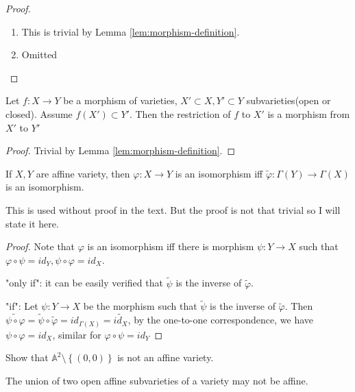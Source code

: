 \documentclass{solution}
\begin{document}
\begin{proof}
    \begin{enumerate}
        \item This is trivial by Lemma \ref{lem:morphism-definition}.
        \item Omitted 
    \end{enumerate}
\end{proof}

\begin{problem}{6.16}
    Let $f: X \rightarrow Y$ be a morphism of varieties, $X' \subset X, Y' \subset Y$ subvarieties(open or closed). Assume $f(X') \subset Y'$. Then the restriction of $f$ to $X'$ is a morphism from $X'$ to $Y'$
\end{problem}

\begin{proof}
    Trivial by Lemma \ref{lem:morphism-definition}.
\end{proof}

\begin{lemma} \label{lem:isomorphism}
    If $X, Y$ are affine variety, then $\varphi: X \rightarrow Y$ is an isomorphism iff $\tilde{\varphi}: \Gamma(Y) \rightarrow \Gamma(X)$ is an isomorphism.
\end{lemma}

This is used without proof in the text. But the proof is not that trivial so I will state it here.

\begin{proof}
    Note that $\varphi$ is an isomorphism iff there is morphism $\psi: Y \rightarrow X$ such that $\varphi \circ \psi = id_{Y}, \psi \circ \varphi = id_{X}$.

    "only if": it can be easily verified that $\tilde{\psi}$ is the inverse of $\tilde{\varphi}$.

    "if": Let $\psi: Y \rightarrow X$ be the morphism such that $\tilde{\psi}$ is the inverse of $\tilde{\varphi}$. Then $\tilde{\psi \circ \varphi} = \tilde{\psi} \circ \tilde{\varphi} = id_{\Gamma(X)} = \tilde{id_{X}}$, by the one-to-one correspondence, we have $\psi \circ \varphi = id_X$, similar for $\varphi \circ \psi = id_Y$
\end{proof}

\begin{problem}{6.17}
    \begin{inparaenum}
        \item Show that $\mathbb{A}^2 \setminus \left\lbrace (0, 0) \right\rbrace$ is not an affine variety.
        \item The union of two open affine subvarieties of a variety may not be affine.
    \end{inparaenum}
\end{problem}
\end{document}
